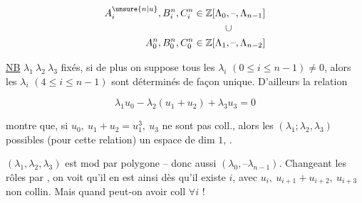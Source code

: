 \endgroup


\[
\begin{aligned}
A_i^{\unsure{n|u}},B_i^n,C_i^n&\in\mathbb Z[\Lambda_0,\text{--},\Lambda_{n-1}]\\
&\hspace{3.2em}\cup\\
A_0^n,B_0^n,C_0^n&\in\mathbb Z[\Lambda_1,\text{--},\Lambda_{n-2}]
\end{aligned}
\]


\uline{NB}   $\lambda_1\ \lambda_2\ \lambda_3$ fixés,  si de plus on suppose tous les  $\lambda_i$ $(0\leq i\leq n-1)\ne0$, alors les $\lambda_i$ $(4\leq i\leq n-1)$ sont déterminés de façon unique. D'ailleurs la relation

\[
\lambda_1u_0-\lambda_2(u_1+u_2)+\lambda_3u_3=0
\]

montre que, si $u_0,\ u_1+u_2=u_1^3,\ u_3$ ne sont pas coll., alors les $(\lambda_1;\lambda_2,\lambda_3)$ possibles (pour cette relation)  un espace de dim $1$,  .


$(\lambda_1,\lambda_2,\lambda_3)$ est  mod  par polygone -- donc aussi $(\lambda_0,\text{--}\lambda_{n-1})$. Changeant les rôles par , on voit qu'il en est ainsi dès qu'il existe $i$, avec $u_i,\ u_{i+1}+u_{i+2},\ u_{i+3}$ non collin. Mais quand peut-on avoir   coll $\forall i$ !

